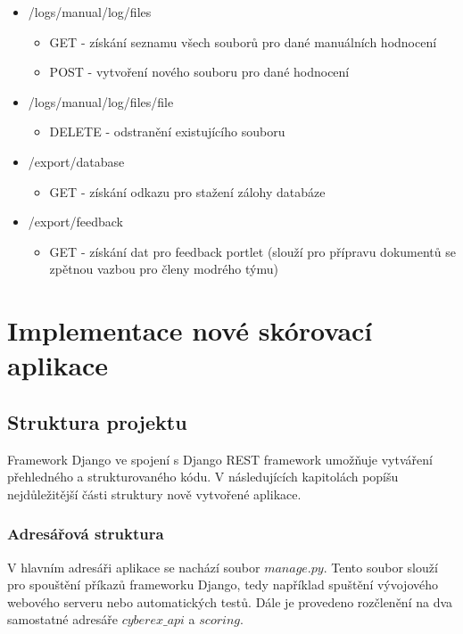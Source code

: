 \documentclass[
  digital, %
  twoside, %
  table,   %
  lof,     %
  lot,     %
]{fithesis3}
\begin{document}
\begin{itemize}
    \item /logs/manual/{log}/files
    \begin{itemize}
        \item GET - získání seznamu všech souborů pro dané manuálních hodnocení
        \item POST - vytvoření nového souboru pro dané hodnocení
    \end{itemize}
            
    \item /logs/manual/{log}/files/{file}
    \begin{itemize}
        \item DELETE - odstranění existujícího souboru
    \end{itemize}
            
    \item /export/database
    \begin{itemize}
        \item GET - získání odkazu pro stažení zálohy databáze
    \end{itemize}
                
    \item /export/feedback
    \begin{itemize}
        \item GET - získání dat pro feedback portlet (slouží pro přípravu dokumentů se zpětnou vazbou pro členy modrého týmu)
    \end{itemize}

\end{itemize}


\chapter{Implementace nové skórovací aplikace}

\section{Struktura projektu}
Framework Django ve spojení s Django REST framework umožňuje vytváření přehledného a strukturovaného kódu. V následujících kapitolách popíšu nejdůležitější části struktury nově vytvořené aplikace.

\subsection{Adresářová struktura}
V hlavním adresáři aplikace se nachází soubor $manage.py$. Tento soubor slouží pro spouštění příkazů frameworku Django, tedy například spuštění vývojového webového serveru nebo automatických testů. Dále je provedeno rozčlenění na dva samostatné adresáře $cyberex\_api$ a $scoring$.
\end{document}
